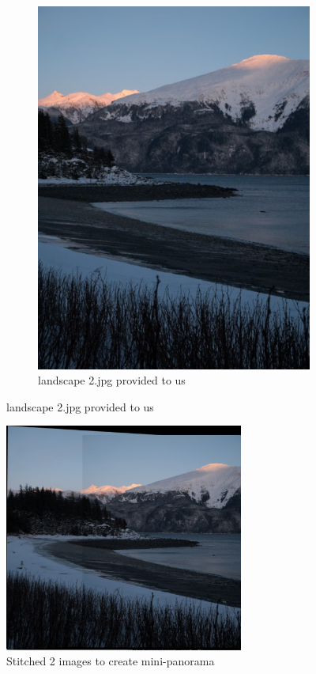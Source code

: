 \documentclass{csc_assignment4}
\begin{document}
\begin{description}
\begin{enumerate}[label=(\alph*)]
\begin{figure}[h!]
\begin{subfigure}[b]{0.5\linewidth}
    \includegraphics[width=\linewidth]{data/landscape_2.jpg}
    \caption{landscape 2.jpg provided to us}
  \end{subfigure}
\end{figure}

\clearpage
\begin{figure}[t!]
\includegraphics[width=0.7\textwidth, center]{stitched_image_2.png}
\caption{Stitched 2 images to create mini-panorama}
\end{figure}


\end{enumerate}
\end{description}
\end{document}
